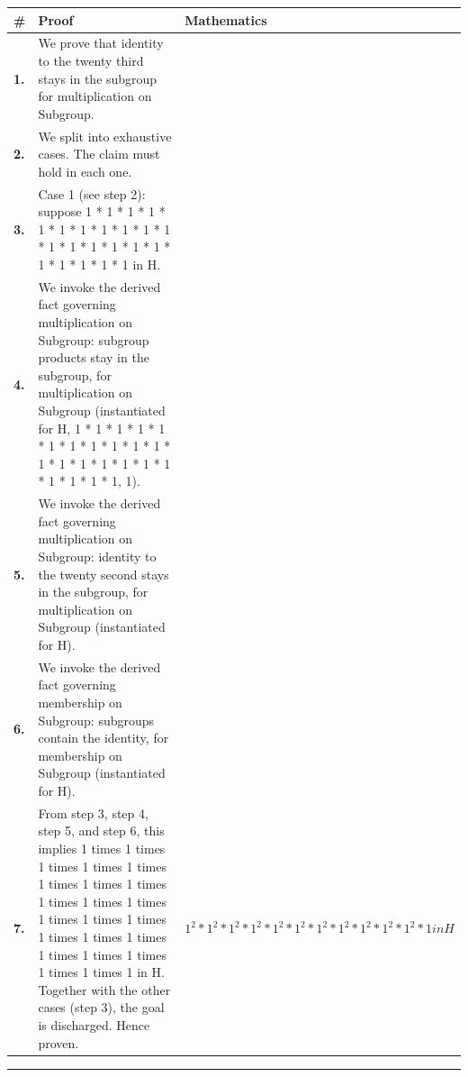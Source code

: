 \documentclass[11pt]{article}
\theoremstyle{definition}
\begin{document}
\begin{tabular}{@{} >{\raggedright\arraybackslash}p{} >{\raggedright\arraybackslash}p{} >{\raggedleft\arraybackslash}p{} @{}}
\textbf{\#} & \textbf{Proof} & \textbf{Mathematics} \\
\midrule
\textbf{1.} & We prove that identity to the twenty third stays in the subgroup for multiplication on Subgroup. & \\[0.45em]
\textbf{2.} & We split into exhaustive cases. The claim must hold in each one. & \\[0.45em]
\textbf{3.} & Case 1 (see step 2): suppose 1 * 1 * 1 * 1 * 1 * 1 * 1 * 1 * 1 * 1 * 1 * 1 * 1 * 1 * 1 * 1 * 1 * 1 * 1 * 1 * 1 * 1 in H. & \\[0.45em]
\textbf{4.} & We invoke the derived fact governing multiplication on Subgroup: subgroup products stay in the subgroup, for multiplication on Subgroup (instantiated for H, 1 * 1 * 1 * 1 * 1 * 1 * 1 * 1 * 1 * 1 * 1 * 1 * 1 * 1 * 1 * 1 * 1 * 1 * 1 * 1 * 1 * 1, 1). & \\[0.45em]
\textbf{5.} & We invoke the derived fact governing multiplication on Subgroup: identity to the twenty second stays in the subgroup, for multiplication on Subgroup (instantiated for H). & \\[0.45em]
\textbf{6.} & We invoke the derived fact governing membership on Subgroup: subgroups contain the identity, for membership on Subgroup (instantiated for H). & \\[0.45em]
\textbf{7.} & From step 3, step 4, step 5, and step 6, this implies 1 times 1 times 1 times 1 times 1 times 1 times 1 times 1 times 1 times 1 times 1 times 1 times 1 times 1 times 1 times 1 times 1 times 1 times 1 times 1 times 1 times 1 times 1 in H. Together with the other cases (step 3), the goal is discharged. Hence proven. & $\displaystyle 1^{2} * 1^{2} * 1^{2} * 1^{2} * 1^{2} * 1^{2} * 1^{2} * 1^{2} * 1^{2} * 1^{2} * 1^{2} * 1 in H$ \\[0.45em]
\bottomrule
\end{tabular}
\label{thm:Subgroup-multiplication-identity_to_the_twenty_third_stays_in_the_subgroup}
\par\medskip\hrule
\end{document}
